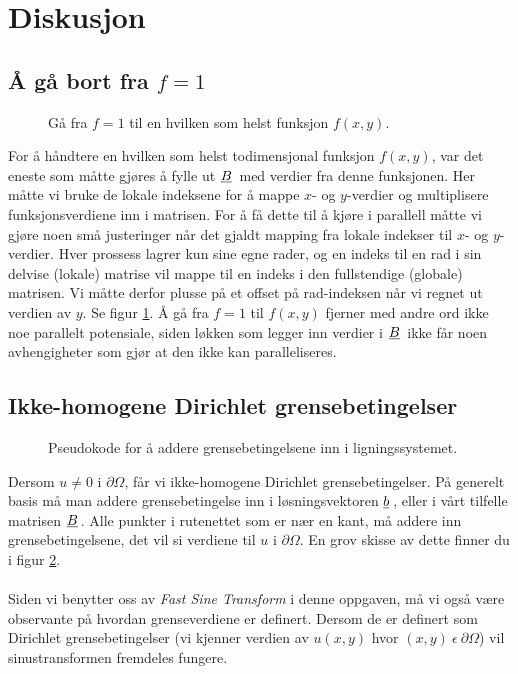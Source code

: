 \documentclass{article}
\newcommand{\ub}[1]{\underbar{$#1$}\,}
\begin{document}
\section{Diskusjon}
\subsection{Å gå bort fra $f=1$}
\begin{figure}[h]
	\centering
	
	\caption{Gå fra $f=1$ til en hvilken som helst funksjon $f(x, y)$.}
	\label{fig:local_f}
\end{figure}
For å håndtere en hvilken som helst todimensjonal funksjon $f(x, y)$, var det eneste som måtte gjøres å fylle ut $\ub{B}$ med verdier fra denne funksjonen. Her måtte vi bruke de lokale indeksene for å mappe $x$- og $y$-verdier og multiplisere funksjonsverdiene inn i matrisen. For å få dette til å kjøre i parallell måtte vi gjøre noen små justeringer når det gjaldt mapping fra lokale indekser til $x$- og $y$-verdier. Hver prossess lagrer kun sine egne rader, og en indeks til en rad i sin delvise (lokale) matrise vil mappe til en indeks i den fullstendige (globale) matrisen. Vi måtte derfor plusse på et offset på rad-indeksen når vi regnet ut verdien av $y$. Se figur \ref{fig:local_f}. Å gå fra $f=1$ til $f(x, y)$ fjerner med andre ord ikke noe parallelt potensiale, siden løkken som legger inn verdier i $\ub{B}$ ikke får noen avhengigheter som gjør at den ikke kan paralleliseres.

\subsection{Ikke-homogene Dirichlet grensebetingelser}
\begin{figure}[h]
	\centering
	
	\caption{Pseudokode for å addere grensebetingelsene inn i ligningssystemet.}
	\label{fig:non_homogenous_dirichlet}
\end{figure}
Dersom $u \neq 0$ i $\partial\Omega$, får vi ikke-homogene Dirichlet grensebetingelser. På generelt basis må man addere grensebetingelse inn i løsningsvektoren $\ub{b}$, eller i vårt tilfelle matrisen $\ub{B}$. Alle punkter i rutenettet som er nær en kant, må addere inn grensebetingelsene, det vil si verdiene til $u$ i $\partial\Omega$. En grov skisse av dette finner du i figur \ref{fig:non_homogenous_dirichlet}. \\
\\
Siden vi benytter oss av \emph{Fast Sine Transform} i denne oppgaven, må vi også være observante på hvordan grenseverdiene er definert. Dersom de er definert som Dirichlet grensebetingelser (vi kjenner verdien av $u(x, y)$ hvor $(x, y)\ \epsilon\ \partial\Omega$) vil sinustransformen fremdeles fungere.\\
\end{document}
